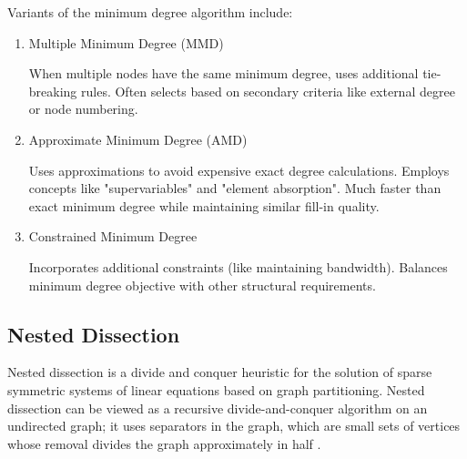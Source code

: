 Variants of the minimum degree algorithm include:

\begin{enumerate}
    \item Multiple Minimum Degree (MMD) \cite{liu_modification_1985}

    When multiple nodes have the same minimum degree, uses additional tie-breaking rules. Often selects based on secondary criteria like external degree or node numbering.

    \item Approximate Minimum Degree (AMD) \cite{amestoy_approximate_1996}

    Uses approximations to avoid expensive exact degree calculations. Employs concepts like "supervariables" and "element absorption". Much faster than exact minimum degree while maintaining similar fill-in quality.

    \item Constrained Minimum Degree

    Incorporates additional constraints (like maintaining bandwidth). Balances minimum degree objective with other structural requirements.

\end{enumerate}

\subsection{Nested Dissection}

Nested dissection is a divide and conquer heuristic for the solution of sparse symmetric systems of linear equations based on graph partitioning. Nested dissection can be viewed as a recursive divide-and-conquer algorithm on an undirected graph; it uses separators in the graph, which are small sets of vertices whose removal divides the graph approximately in half  \cite{lipton_generalized_1979}.

